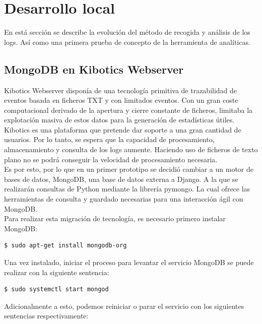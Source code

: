 \documentclass[11pt,a4paper]{book}
\begin{document}
			
		\section{Desarrollo local}
			En está sección se describe la evolución del método de recogida y análisis de los logs. Así como una primera prueba de concepto de la herramienta de analíticas.
			\subsection{MongoDB en Kibotics Webserver}
			Kibotics Webserver disponía de una tecnología primitiva de trazabilidad de eventos basada en ficheros TXT y con limitados eventos. Con un gran coste computacional derivado de la apertura y cierre constante de ficheros, limitaba la explotación masiva de estos datos para la generación de estadísticas útiles.\\
			
			Kibotics es una plataforma que pretende dar soporte a una gran cantidad de usuarios. Por lo tanto, se espera que la capacidad de procesamiento, almacenamiento y consulta de los logs aumente. Haciendo uso de ficheros de texto plano no se podrá conseguir la velocidad de procesamiento necesaria. \\
			
			Es por esto, por lo que en un primer prototipo se decidió cambiar a un motor de bases de datos, MongoDB, una base de datos externa a Django. A la que se realizarán consultas de Python mediante la librería pymongo. La cual ofrece las herramientas de consulta y guardado necesarias para una interacción ágil con MongoDB.\\
			
			Para realizar esta migración de tecnología, es necesario primero instalar MongoDB:
			
			\begin{Verbatim}[tabsize=4]
$ sudo apt-get install mongodb-org
			\end{Verbatim}

			
			Una vez instalado, iniciar el proceso para levantar el servicio MongoDB se puede realizar con la siguiente sentencia:
			
			\begin{Verbatim}[tabsize=4]
$ sudo systemctl start mongod
			\end{Verbatim}
			
			Adicionalmente a esto, podemos reiniciar o parar el servicio con los siguientes sentencias respectivamente:
			
\end{document}
